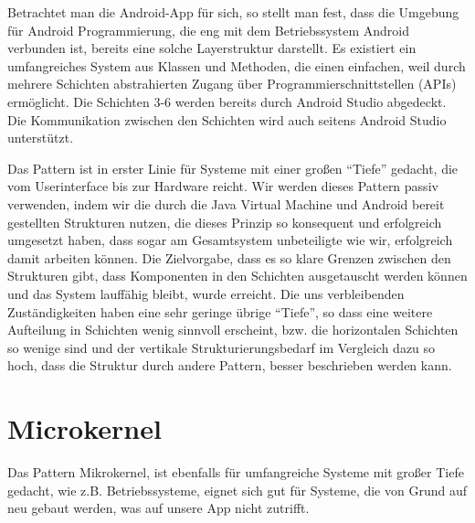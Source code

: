 \documentclass{scrreprt}
\begin{document}
Betrachtet man die Android-App für sich, so stellt man fest, dass die Umgebung für Android Programmierung, die eng mit dem Betriebssystem Android verbunden ist, bereits eine solche Layerstruktur darstellt. Es existiert ein umfangreiches System aus Klassen und Methoden, die einen einfachen, weil durch mehrere Schichten abstrahierten Zugang über Programmierschnittstellen (APIs) ermöglicht. Die Schichten 3-6 werden bereits durch Android Studio abgedeckt. Die Kommunikation zwischen den Schichten wird auch seitens Android Studio unterstützt.

Das Pattern ist in erster Linie für Systeme mit einer großen “Tiefe” gedacht, die vom Userinterface bis zur Hardware reicht. Wir werden dieses Pattern passiv verwenden, indem wir die durch die Java Virtual Machine und Android bereit gestellten Strukturen nutzen, die dieses Prinzip so konsequent und erfolgreich umgesetzt haben, dass sogar am Gesamtsystem unbeteiligte wie wir, erfolgreich damit arbeiten können. Die Zielvorgabe, dass es so klare Grenzen zwischen den Strukturen gibt, dass Komponenten in den Schichten ausgetauscht werden können und das System lauffähig bleibt, wurde erreicht.
Die uns verbleibenden Zuständigkeiten haben eine sehr geringe übrige “Tiefe”, so dass eine weitere Aufteilung in Schichten wenig sinnvoll erscheint, bzw. die horizontalen Schichten so wenige sind und der vertikale Strukturierungsbedarf im Vergleich dazu so hoch, dass die Struktur durch andere Pattern, besser beschrieben werden kann.

\section{Microkernel}

Das Pattern Mikrokernel, ist ebenfalls für umfangreiche Systeme mit großer Tiefe gedacht, wie z.B. Betriebssysteme, eignet sich gut für Systeme, die von Grund auf neu gebaut werden, was auf unsere App nicht zutrifft.
\end{document}
